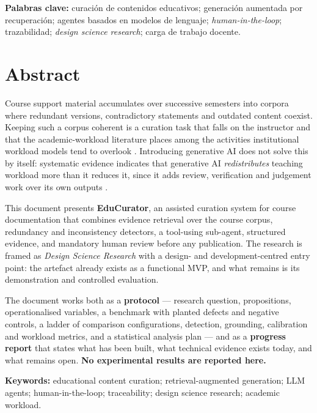 \vspace{0.4em}
\noindent\textbf{Palabras clave:} curación de contenidos educativos; generación
aumentada por recuperación; agentes basados en modelos de lenguaje;
\emph{human-in-the-loop}; trazabilidad; \emph{design science research}; carga de
trabajo docente.

\vspace{1.2em}

\section*{Abstract}

Course support material accumulates over successive semesters into corpora where
redundant versions, contradictory statements and outdated content coexist. Keeping
such a corpus coherent is a curation task that falls on the instructor and that the
academic-workload literature places among the activities institutional workload
models tend to overlook \parencite{kenny2023life}. Introducing generative AI does
not solve this by itself: systematic evidence indicates that generative AI
\emph{redistributes} teaching workload more than it reduces it, since it adds
review, verification and judgement work over its own outputs
\parencite{su2026efficiency}.

This document presents \textbf{EduCurator}, an assisted curation system for course
documentation that combines evidence retrieval over the course corpus, redundancy
and inconsistency detectors, a tool-using sub-agent, structured evidence, and
mandatory human review before any publication. The research is framed as
\emph{Design Science Research} \parencite{peffers2007design,hevner2004design} with a
design- and development-centred entry point: the artefact already exists as a
functional MVP, and what remains is its demonstration and controlled evaluation.

The document works both as a \textbf{protocol} --- research question, propositions,
operationalised variables, a benchmark with planted defects and negative controls,
a ladder of comparison configurations, detection, grounding, calibration and
workload metrics, and a statistical analysis plan --- and as a
\textbf{progress report} that states what has been built, what technical evidence
exists today, and what remains open. \textbf{No experimental results are reported
here.}

\vspace{0.4em}
\noindent\textbf{Keywords:} educational content curation; retrieval-augmented
generation; LLM agents; human-in-the-loop; traceability; design science research;
academic workload.
